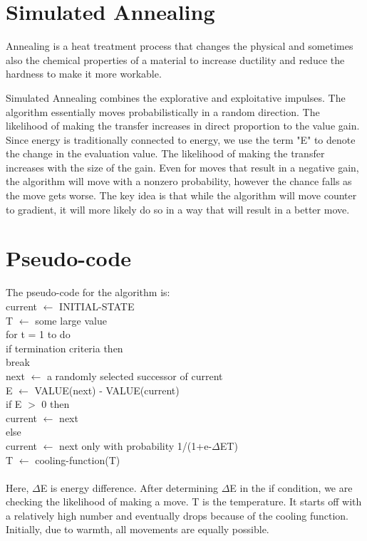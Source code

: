 \documentclass[conference]{IEEEtran}
\begin{document}
\section{Simulated Annealing}
Annealing is a heat treatment process that changes the physical and sometimes also the chemical properties of a material to increase ductility and reduce the hardness to make it more workable.

Simulated Annealing combines the explorative and exploitative impulses. The algorithm essentially moves probabilistically in a random direction. The likelihood of making the transfer increases in direct proportion to the value gain. Since energy is traditionally connected to energy, we use the term "E" to denote the change in the evaluation value. The likelihood of making the transfer increases with the size of the gain. Even for moves that result in a negative gain, the algorithm will move with a nonzero probability, however the chance falls as the move gets worse. The key idea is that while the algorithm will move counter to gradient, it will more likely do so in a way that will result in a better move.
\section{Pseudo-code}
The pseudo-code for the algorithm is:\\
current $\leftarrow$ INITIAL-STATE\\
T $\leftarrow$ some large value\\
for t = 1 to do\\
\indent if termination criteria then\\
\indent \indent break\\
\indent next $\leftarrow$ a randomly selected successor of current\\
\indent E $\leftarrow$ VALUE(next) - VALUE(current)\\
\indent if E $>$ 0 then\\
\indent \indent current $\leftarrow$ next\\
\indent else\\
\indent \indent current $\leftarrow$ next only with probability 1/(1+e-$\Delta$ET)\\
T $\leftarrow$ cooling-function(T)\\ \\
\indent Here, $\Delta$E is energy difference. After determining $\Delta$E in the if condition, we are checking the likelihood of making a move. T is the temperature. It starts off with a relatively high number and eventually drops because of the cooling function. Initially, due to warmth, all movements are equally possible.
\end{document}
